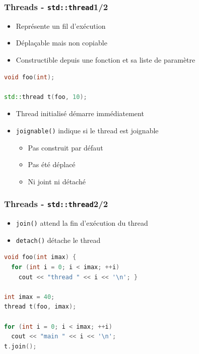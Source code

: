 \documentclass[C++.tex]{subfiles}
\begin{document}
\begin{frame}[fragile]
	\frametitle{Threads - \lstinline|std::thread|\titlehfill{}1/2}
	\begin{itemize}
		\item Représente un fil d'exécution
		\item Déplaçable mais non copiable
		\item Constructible depuis une fonction et sa liste de paramètre
	\end{itemize}

	\begin{lstlisting}[language=C++]
void foo(int);

std::thread t(foo, 10);\end{lstlisting}

	\begin{itemize}
		\item Thread initialisé démarre immédiatement
		\item \lstinline|joignable()| indique si le thread est joignable
		\begin{itemize}
			\item Pas construit par défaut
			\item Pas été déplacé
			\item Ni joint ni détaché
		\end{itemize}
	\end{itemize}
\end{frame}

\begin{frame}[fragile]
	\frametitle{Threads - \lstinline|std::thread|\titlehfill{}2/2}
	\begin{itemize}
		\item \lstinline|join()| attend la fin d'exécution du thread
		\item \lstinline|detach()| détache le thread
	\end{itemize}

	\begin{lstlisting}[language=C++]
void foo(int imax) {
  for (int i = 0; i < imax; ++i)
    cout << "thread " << i << '\n'; }

int imax = 40;
thread t(foo, imax);

for (int i = 0; i < imax; ++i)
  cout << "main " << i << '\n';
t.join();\end{lstlisting}
\end{frame}
\end{document}
